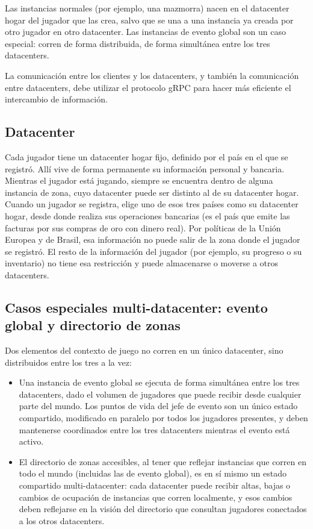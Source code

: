 \documentclass[variant=guia,cover=institutional,mode=screen]{ua-engineering-v6-article}
\begin{document}
    Las instancias normales (por ejemplo, una mazmorra) nacen en el datacenter hogar del jugador que las crea, salvo que se una a una instancia ya creada por otro jugador en otro datacenter.
    Las instancias de evento global son un caso especial: corren de forma distribuida, de forma simultánea entre los tres datacenters.

    La comunicación entre los clientes y los datacenters, y también la comunicación entre datacenters, debe utilizar el protocolo gRPC para hacer más eficiente el intercambio de información.

    \subsection{Datacenter}\label{subsec:datacenter}

    Cada jugador tiene un datacenter hogar fijo, definido por el país en el que se registró.
    Allí vive de forma permanente su información personal y bancaria.
    Mientras el jugador está jugando, siempre se encuentra dentro de alguna instancia de zona, cuyo datacenter puede ser distinto al de su datacenter hogar.
    Cuando un jugador se registra, elige uno de esos tres países como su datacenter hogar, desde donde realiza sus operaciones bancarias (es el país que emite las facturas por sus compras de oro con dinero real).
    Por políticas de la Unión Europea y de Brasil, esa información no puede salir de la zona donde el jugador se registró.
    El resto de la información del jugador (por ejemplo, su progreso o su inventario) no tiene esa restricción y puede almacenarse o moverse a otros datacenters.

    \subsection{Casos especiales multi-datacenter: evento global y directorio de zonas}\label{subsec:casos-multi-datacenter}

    Dos elementos del contexto de juego no corren en un único datacenter, sino distribuidos entre los tres a la vez:

    \begin{itemize}
        \item Una instancia de evento global se ejecuta de forma simultánea entre los tres datacenters, dado el volumen de jugadores que puede recibir desde cualquier parte del mundo.
        Los puntos de vida del jefe de evento son un único estado compartido, modificado en paralelo por todos los jugadores presentes, y deben mantenerse coordinados entre los tres datacenters mientras el evento está activo.
        \item El directorio de zonas accesibles, al tener que reflejar instancias que corren en todo el mundo (incluidas las de evento global), es en sí mismo un estado compartido multi-datacenter: cada datacenter puede recibir altas, bajas o cambios de ocupación de instancias que corren localmente, y esos cambios deben reflejarse en la visión del directorio que consultan jugadores conectados a los otros datacenters.
    \end{itemize}
\end{document}

